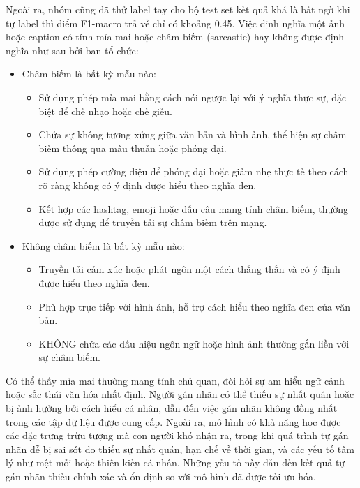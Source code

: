 \documentclass[11pt]{article}
\begin{document}
Ngoài ra, nhóm cũng đã thử label tay cho bộ test set kết quả khá là bất ngờ khi tự label thì điểm F1-macro trả về chỉ có khoảng 0.45. Việc định nghĩa một ảnh hoặc caption có tính mỉa mai hoặc châm biếm (sarcastic) hay không được định nghĩa như sau bởi ban tổ chức:
\vspace*{-3mm}
\begin{itemize}
    \item Châm biếm là bất kỳ mẫu nào:
    \vspace*{-2mm}
    \begin{itemize}
        \item Sử dụng phép mỉa mai bằng cách nói ngược lại với ý nghĩa thực sự, đặc biệt để chế nhạo hoặc chế giễu.
        \item Chứa sự không tương xứng giữa văn bản và hình ảnh, thể hiện sự châm biếm thông qua mâu thuẫn hoặc phóng đại.
        \item Sử dụng phép cường điệu để phóng đại hoặc giảm nhẹ thực tế theo cách rõ ràng không có ý định được hiểu theo nghĩa đen.
        \item Kết hợp các hashtag, emoji hoặc dấu câu mang tính châm biếm, thường được sử dụng để truyền tải sự châm biếm trên mạng.
    \end{itemize}
    \vspace*{-2mm}
    \item Không châm biếm là bất kỳ mẫu nào:
    \vspace*{-2mm}
    \begin{itemize}
        \item Truyền tải cảm xúc hoặc phát ngôn một cách thẳng thắn và có ý định được hiểu theo nghĩa đen.
        \item Phù hợp trực tiếp với hình ảnh, hỗ trợ cách hiểu theo nghĩa đen của văn bản.
        \item KHÔNG chứa các dấu hiệu ngôn ngữ hoặc hình ảnh thường gắn liền với sự châm biếm.
    \end{itemize}
\end{itemize}  
\vspace*{-3mm}
\hspace*{5mm}Có thể thấy mỉa mai thường mang tính chủ quan, đòi hỏi sự am hiểu ngữ cảnh hoặc sắc thái văn hóa nhất định. Người gán nhãn có thể thiếu sự nhất quán hoặc bị ảnh hưởng bởi cách hiểu cá nhân, dẫn đến việc gán nhãn không đồng nhất trong các tập dữ liệu được cung cấp. Ngoài ra, mô hình có khả năng học được các đặc trưng trừu tượng mà con người khó nhận ra, trong khi quá trình tự gán nhãn dễ bị sai sót do thiếu sự nhất quán, hạn chế về thời gian, và các yếu tố tâm lý như mệt mỏi hoặc thiên kiến cá nhân. Những yếu tố này dẫn đến kết quả tự gán nhãn thiếu chính xác và ổn định so với mô hình đã được tối ưu hóa.
\end{document}
